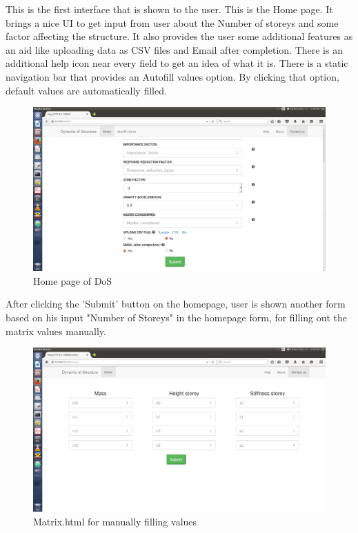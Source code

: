 This is the first interface that is shown to the user. This is the Home page.
It brings a nice UI to get input from user about the Number of storeys and 
some factor affecting the structure. It also provides the user some 
additional features as an aid like uploading data as CSV files and Email 
after completion. There is an additional help icon near every field to get 
an idea of what it is. There is a static navigation bar that provides an 
Autofill values option. By clicking that option, default values are 
automatically filled.

\begin{figure} 
\centering \includegraphics[scale=0.32]{images/output/1.png}
\caption{Home page of DoS}
\end{figure}

After clicking the 'Submit' button on the homepage, user is shown another 
form based on his input "Number of Storeys" in the homepage form, for 
filling out the matrix values manually.

\begin{figure} 
\centering \includegraphics[scale=0.32]{images/output/2.png}
\caption{Matrix.html for manually filling values}
\end{figure}

